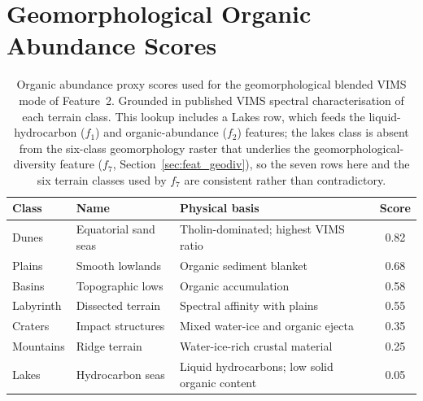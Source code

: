 \chapter{Geomorphological Organic Abundance Scores}
\label{app:geo_scores}

\begin{table}[H]
\centering
\begin{tabular}{llp{5.0cm}c}
\toprule
\textbf{Class} & \textbf{Name} & \textbf{Physical basis} & \textbf{Score} \\
\midrule
Dunes     & Equatorial sand seas & Tholin-dominated; highest VIMS ratio \citep{Lorenz2006}           & 0.82 \\
Plains    & Smooth lowlands      & Organic sediment blanket \citep{Lopes2019b}                        & 0.68 \\
Basins    & Topographic lows     & Organic accumulation \citep{Lopes2020}                            & 0.58 \\
Labyrinth & Dissected terrain    & Spectral affinity with plains \citep{Malaska2020}                 & 0.55 \\
Craters   & Impact structures    & Mixed water-ice and organic ejecta \citep{Neish2018}              & 0.35 \\
Mountains & Ridge terrain        & Water-ice-rich crustal material \citep{Solomonidou2018}           & 0.25 \\
Lakes     & Hydrocarbon seas     & Liquid hydrocarbons; low solid organic content \citep{Brown2008}  & 0.05 \\
\bottomrule
\end{tabular}
\caption{Organic abundance proxy scores used for the geomorphological
blended VIMS mode of Feature~2.  Grounded in published VIMS spectral
characterisation of each terrain class.  This lookup includes a Lakes row,
which feeds the liquid-hydrocarbon ($f_1$) and organic-abundance ($f_2$)
features; the lakes class is absent from the six-class geomorphology raster
that underlies the geomorphological-diversity feature ($f_7$,
Section~\ref{sec:feat_geodiv}), so the seven rows here and the six terrain
classes used by $f_7$ are consistent rather than contradictory.}
\label{tab:geo_scores}
\end{table}